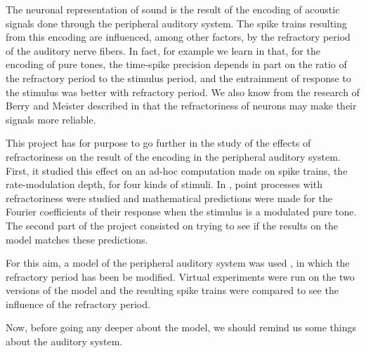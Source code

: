 The neuronal representation of sound is the result of the encoding of acoustic 
signals done through the peripheral auditory system. 
The spike trains resulting from this encoding are influenced, 
among other factors, by the refractory period of the auditory nerve fibers. 
In fact, for example we learn in \cite{AvissarPapier} that, for the encoding of pure tones, 
the time-spike precision depends in part on the ratio of  
the refractory period to the stimulus period, 
and the entrainment of response to the stimulus was better with refractory period. 
We also know from the research of Berry and Meister described 
in \cite{BerryMeister} that the refractoriness of neurons may make their signals 
more reliable. 


This project has for purpose to go further in the study of the effects of  
refractoriness on the result of the encoding in the peripheral 
auditory system.  
First, it studied this effect on an ad-hoc computation made on spike trains,  
the rate-modulation depth, for four kinds of stimuli.
In \cite{Deger}, point processes with refractoriness were studied and mathematical 
predictions were made for the Fourier coefficients of their response 
when the stimulus is a modulated pure tone.%
The second part of the project consisted on trying to see 
if the results on the model matches these predictions. 



For this aim, a model of the peripheral auditory system was used
\cite{Model1, Model2, Model3}, in which the refractory period has been be modified. 
Virtual experiments were run on the two versions of the model and the resulting 
spike trains were compared to see the influence of the refractory period.
 
Now, before going any deeper about the model, we should remind us some things 
about the auditory system.



